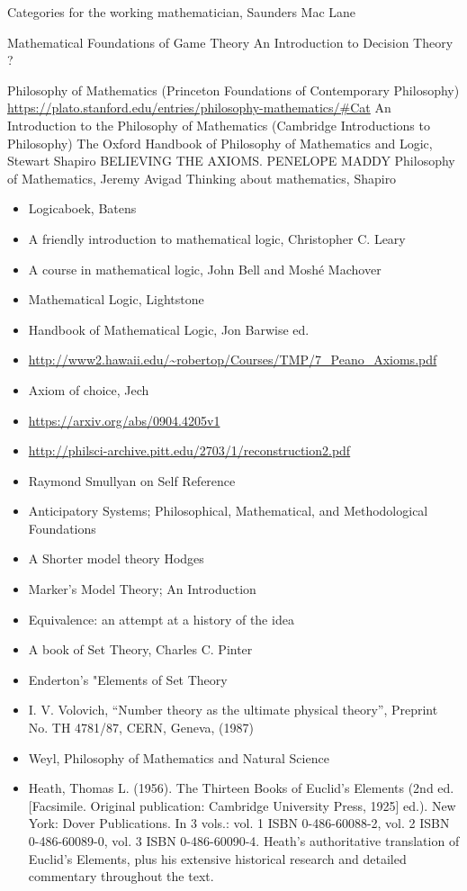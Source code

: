 \documentclass{report}
\begin{document}
Categories for the working mathematician, Saunders Mac Lane

Mathematical Foundations of Game Theory
An Introduction to Decision Theory ?

Philosophy of Mathematics (Princeton Foundations of Contemporary Philosophy)
\url{https://plato.stanford.edu/entries/philosophy-mathematics/#Cat}
An Introduction to the Philosophy of Mathematics (Cambridge Introductions to Philosophy)
The Oxford Handbook of Philosophy of Mathematics and Logic, Stewart Shapiro
BELIEVING THE AXIOMS. PENELOPE MADDY
Philosophy of Mathematics, Jeremy Avigad
Thinking about mathematics, Shapiro


\begin{itemize}
\item Logicaboek, Batens
\item A friendly introduction to mathematical logic, Christopher C. Leary
\item A course in mathematical logic, John Bell and Moshé Machover
\item Mathematical Logic, Lightstone
\item Handbook of Mathematical Logic, Jon Barwise ed.
\item \url{http://www2.hawaii.edu/~robertop/Courses/TMP/7_Peano_Axioms.pdf}
\item Axiom of choice, Jech
\item \url{https://arxiv.org/abs/0904.4205v1}
\item \url{http://philsci-archive.pitt.edu/2703/1/reconstruction2.pdf}
\item Raymond Smullyan on Self Reference
\item Anticipatory Systems; Philosophical, Mathematical, and Methodological Foundations
\item A Shorter model theory Hodges
\item Marker's Model Theory; An Introduction
\item Equivalence: an attempt at a history of the idea
\item A book of Set Theory, Charles C. Pinter
\item Enderton's "Elements of Set Theory
\item I. V. Volovich, ``Number theory as the ultimate physical theory'', Preprint No. TH 4781/87, CERN, Geneva, (1987)
\item Weyl, Philosophy of Mathematics and Natural Science
\item Heath, Thomas L. (1956). The Thirteen Books of Euclid's Elements (2nd ed. [Facsimile. Original publication: Cambridge University Press, 1925] ed.). New York: Dover Publications. In 3 vols.: vol. 1 ISBN 0-486-60088-2, vol. 2 ISBN 0-486-60089-0, vol. 3 ISBN 0-486-60090-4. Heath's authoritative translation of Euclid's Elements, plus his extensive historical research and detailed commentary throughout the text.

\end{itemize}
\end{document}
